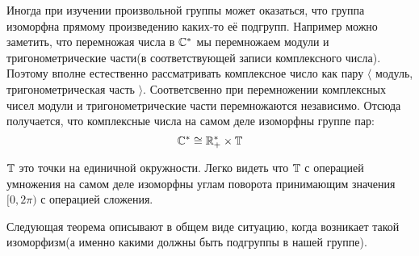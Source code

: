 \documentclass[../main.tex]{subfiles}
\begin{document}
Иногда при изучении произвольной группы может оказаться, что группа изоморфна прямому произведению каких-то её подгрупп. Например можно заметить, что перемножая числа в $\mathbb{C}^{*}$ мы перемножаем модули и тригонометрические части(в соответствующей записи комплексного числа). Поэтому вполне естественно рассматривать комплексное число как пару $\langle$ модуль, тригонометрическая часть $\rangle$. Соответсвенно при перемножении комплексных чисел модули и тригонометрические части перемножаются независимо.
Отсюда получается, что комплексные числа на самом деле изоморфны группе пар:
\begin{equation*}
  \mathbb{C}^{*} \cong \mathbb{R}_{+}^{*} \times \mathbb{T}
\end{equation*}
\begin{editremark}
  $\mathbb{T}$ это точки на единичной окружности. Легко видеть что $\mathbb{T}$ с операцией умножения на самом деле изоморфны углам поворота принимающим значения $[0, 2\pi)$ с операцией сложения.
\end{editremark}
\noindent Следующая теорема описывают в общем виде ситуацию, когда возникает такой изоморфизм(а именно какими должны быть подгруппы в нашей группе).
\end{document}
